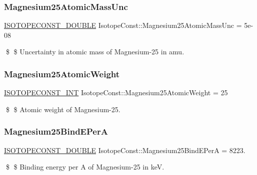\subsubsection{\texorpdfstring{Magnesium25\+Atomic\+Mass\+Unc}{Magnesium25AtomicMassUnc}}
{\footnotesize\ttfamily \mbox{\hyperlink{group___isotope_const-_macros_ga8f45a7272ce02c0b4c65c44636ed719a}{I\+S\+O\+T\+O\+P\+E\+C\+O\+N\+S\+T\+\_\+\+D\+O\+U\+B\+LE}} Isotope\+Const\+::\+Magnesium25\+Atomic\+Mass\+Unc = 5e-\/08}

\$ \$ Uncertainty in atomic mass of Magnesium-\/25 in amu. \mbox{\label{group___isotope_const-_magnesium-_mg25_ga3ecddbdb03e31bd58936c04f9add470d}} 
\subsubsection{\texorpdfstring{Magnesium25\+Atomic\+Weight}{Magnesium25AtomicWeight}}
{\footnotesize\ttfamily \mbox{\hyperlink{group___isotope_const-_macros_ga5f18360b3e99483a35c32d789e62621c}{I\+S\+O\+T\+O\+P\+E\+C\+O\+N\+S\+T\+\_\+\+I\+NT}} Isotope\+Const\+::\+Magnesium25\+Atomic\+Weight = 25}

\$ \$ Atomic weight of Magnesium-\/25. \mbox{\label{group___isotope_const-_magnesium-_mg25_ga2b503422f899eec88877f54585d2af8c}} 
\subsubsection{\texorpdfstring{Magnesium25\+Bind\+E\+PerA}{Magnesium25BindEPerA}}
{\footnotesize\ttfamily \mbox{\hyperlink{group___isotope_const-_macros_ga8f45a7272ce02c0b4c65c44636ed719a}{I\+S\+O\+T\+O\+P\+E\+C\+O\+N\+S\+T\+\_\+\+D\+O\+U\+B\+LE}} Isotope\+Const\+::\+Magnesium25\+Bind\+E\+PerA = 8223.}

\$ \$ Binding energy per A of Magnesium-\/25 in keV. \mbox{\label{group___isotope_const-_magnesium-_mg25_ga24ab7815d43973158f71ef6d6b7871be}} 
